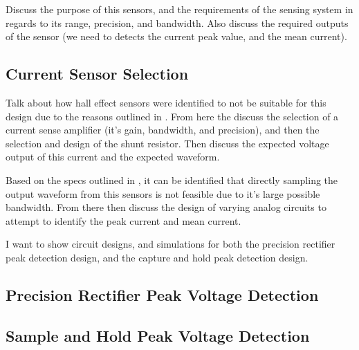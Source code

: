Discuss the purpose of this sensors, and the requirements of the sensing system in regards to its range, precision, and bandwidth. Also discuss the required outputs of the sensor (we need to detects the current peak value, and the mean current).


\subsection{Current Sensor Selection}

Talk about how hall effect sensors were identified to not be suitable for this design due to the reasons outlined in . From here the discuss the selection of a current sense amplifier (it's gain, bandwidth, and precision), and then the selection and design of the shunt resistor. Then discuss the expected voltage output of this current and the expected waveform. 


Based on the specs outlined in , it can be identified that directly sampling the output waveform from this sensors is not feasible due to it's large possible bandwidth. From there then discuss the design of varying analog circuits to attempt to identify the peak current and mean current. 

I want to show circuit designs, and simulations for both the precision rectifier peak detection design, and the capture and hold peak detection design. 

\subsection{Precision Rectifier Peak Voltage Detection}

\subsection{Sample and Hold Peak Voltage Detection}




